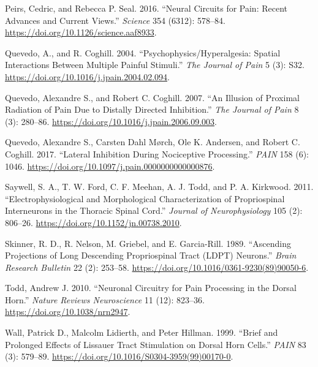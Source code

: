 \documentclass[
]{article}
\newlength{\cslhangindent}
\newlength{\cslentryspacingunit} %
\newenvironment{CSLReferences}[2] %
 {%
  \setlength{\parindent}{0pt}
  \ifodd #1
  \let\oldpar\par
  \def\par{\hangindent=\cslhangindent\oldpar}
  \fi
  \setlength{\parskip}{#2\cslentryspacingunit}
 }%
 {}
\begin{document}
\begin{CSLReferences}{1}{0}
\leavevmode{}%
Peirs, Cedric, and Rebecca P. Seal. 2016. {``Neural Circuits for Pain:
{Recent} Advances and Current Views.''} \emph{Science} 354 (6312):
578--84. \url{https://doi.org/10.1126/science.aaf8933}.

\leavevmode{}%
Quevedo, A., and R. Coghill. 2004. {``Psychophysics/Hyperalgesia:
{Spatial} Interactions Between Multiple Painful Stimuli.''} \emph{The
Journal of Pain} 5 (3): S32.
\url{https://doi.org/10.1016/j.jpain.2004.02.094}.

\leavevmode{}%
Quevedo, Alexandre S., and Robert C. Coghill. 2007. {``An {Illusion} of
{Proximal} {Radiation} of {Pain} {Due} to {Distally} {Directed}
{Inhibition}.''} \emph{The Journal of Pain} 8 (3): 280--86.
\url{https://doi.org/10.1016/j.jpain.2006.09.003}.

\leavevmode{}%
Quevedo, Alexandre S., Carsten Dahl Mørch, Ole K. Andersen, and Robert
C. Coghill. 2017. {``Lateral Inhibition During Nociceptive
Processing.''} \emph{PAIN} 158 (6): 1046.
\url{https://doi.org/10.1097/j.pain.0000000000000876}.

\leavevmode{}%
Saywell, S. A., T. W. Ford, C. F. Meehan, A. J. Todd, and P. A.
Kirkwood. 2011. {``Electrophysiological and {Morphological}
{Characterization} of {Propriospinal} {Interneurons} in the {Thoracic}
{Spinal} {Cord}.''} \emph{Journal of Neurophysiology} 105 (2): 806--26.
\url{https://doi.org/10.1152/jn.00738.2010}.

\leavevmode{}%
Skinner, R. D., R. Nelson, M. Griebel, and E. Garcia-Rill. 1989.
{``Ascending Projections of Long Descending Propriospinal Tract ({LDPT})
Neurons.''} \emph{Brain Research Bulletin} 22 (2): 253--58.
\url{https://doi.org/10.1016/0361-9230(89)90050-6}.

\leavevmode{}%
Todd, Andrew J. 2010. {``Neuronal Circuitry for Pain Processing in the
Dorsal Horn.''} \emph{Nature Reviews Neuroscience} 11 (12): 823--36.
\url{https://doi.org/10.1038/nrn2947}.

\leavevmode{}%
Wall, Patrick D., Malcolm Lidierth, and Peter Hillman. 1999. {``Brief
and Prolonged Effects of {Lissauer} Tract Stimulation on Dorsal Horn
Cells.''} \emph{PAIN} 83 (3): 579--89.
\url{https://doi.org/10.1016/S0304-3959(99)00170-0}.

\end{CSLReferences}
\end{document}
